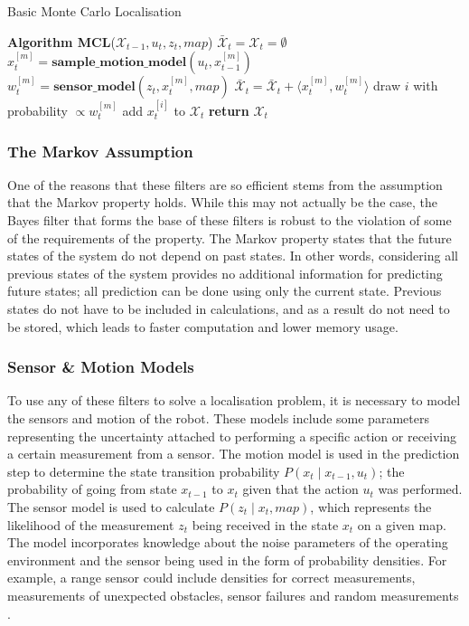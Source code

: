 \documentclass[conference]{IEEEtran}
\begin{document}
\begin{algorithm}
  \caption{Basic Monte Carlo Localisation \cite{thrun}}
  \label{alg:basicMCL}
  \begin{algorithmic}[1]
    \State \textbf{Algorithm MCL}\textnormal{($\mathcal{X}_{t-1}, u_t, z_t, map$)}
    \State $\bar{\mathcal{X}}_t=\mathcal{X}_t=\emptyset$
    \State $x_t^{[m]}=\textbf{sample\_motion\_model}(u_t,x_{t-1}^{[m]})$
    \State $w_t^{[m]}=\textbf{sensor\_model}(z_t,x_t^{[m]},map)$
    \State $\bar{\mathcal{X}}_t=\bar{\mathcal{X}}_t+\langle x_t^{[m]},w_t^{[m]}\rangle$
    \EndFor
    \State \textnormal{draw $i$ with probability $\propto w_t^{[m]}$}
    \State \textnormal{add $x_t^{[i]}$ to $\mathcal{X}_t$}
    \EndFor
    \State \textbf{return} $\mathcal{X}_t$
  \end{algorithmic}
\end{algorithm}

\subsubsection{The Markov Assumption}
One of the reasons that these filters are so efficient stems from the assumption that the Markov property holds. While this may not actually be the case, the Bayes filter that forms the base of these filters is robust to the violation of some of the requirements of the property. The Markov property states that the future states of the system do not depend on past states. In other words, considering all previous states of the system provides no additional information for predicting future states; all prediction can be done using only the current state. Previous states do not have to be included in calculations, and as a result do not need to be stored, which leads to faster computation and lower memory usage.

\subsubsection{Sensor \& Motion Models}
To use any of these filters to solve a localisation problem, it is necessary to model the sensors and motion of the robot. These models include some parameters representing the uncertainty attached to performing a specific action or receiving a certain measurement from a sensor. The motion model is used in the prediction step to determine the state transition probability $P(x_t\mid x_{t-1}, u_t)$; the probability of going from state $x_{t-1}$ to $x_t$ given that the action $u_t$ was performed. The sensor model is used to calculate $P(z_t\mid x_t,map)$, which represents the likelihood of the measurement $z_t$ being received in the state $x_t$ on a given map. The model incorporates knowledge about the noise parameters of the operating environment and the sensor being used in the form of probability densities. For example, a range sensor could include densities for correct measurements, measurements of unexpected obstacles, sensor failures and random measurements \cite{thrun}. 
\end{document}
